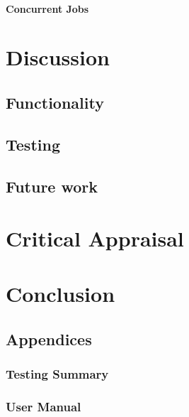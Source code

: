 \documentclass{report}
\begin{document}
\subsubsection{Concurrent Jobs}
\chapter{Discussion}
\section{Functionality}
\section{Testing}
\section{Future work}
\chapter{Critical Appraisal}
\chapter{Conclusion}

\newpage


\newpage
\section*{Appendices}
\subsection*{Testing Summary}
\subsection*{User Manual}
\end{document}
